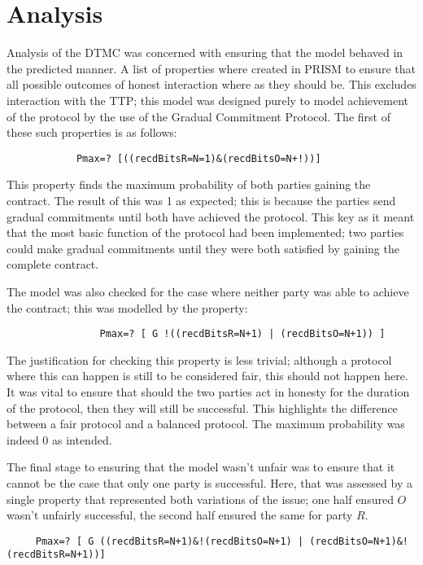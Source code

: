 \documentclass{l4proj}
\begin{document}
\section{Analysis}

Analysis of the DTMC was concerned with ensuring that the model behaved in the predicted manner. A list of properties where created in PRISM to ensure that all possible outcomes of honest interaction where as they should be. This excludes interaction with the TTP; this model was designed purely to model achievement of the protocol by the use of the Gradual Commitment Protocol. The first of these such properties is as follows:

\begin{lstlisting}
            Pmax=? [((recdBitsR=N=1)&(recdBitsO=N+!))]
\end{lstlisting}

This property finds the maximum probability of both parties gaining the contract. The result of this was 1 as expected; this is because the parties send gradual commitments until both have achieved the protocol. This key as it meant that the most basic function of the protocol had been implemented; two parties could make gradual commitments until they were both satisfied by gaining the complete contract.

The model was also checked for the case where neither party was able to achieve the contract; this was modelled by the property:

\begin{lstlisting}
                Pmax=? [ G !((recdBitsR=N+1) | (recdBitsO=N+1)) ]
\end{lstlisting}

The justification for checking this property is less trivial; although a protocol where this can happen is still to be considered fair, this should not happen here. It was vital to ensure that should the two parties act in honesty for the duration of the protocol, then they will still be successful. This highlights the difference between a fair protocol and a balanced protocol. The maximum probability was indeed 0 as intended.

The final stage to ensuring that the model wasn't unfair was to ensure that it cannot be the case that only one party is successful. Here, that was assessed by a single property that represented both variations of the issue; one half ensured $O$ wasn't unfairly successful, the second half ensured the same for party $R$.

\begin{lstlisting}
     Pmax=? [ G ((recdBitsR=N+1)&!(recdBitsO=N+1) | (recdBitsO=N+1)&!(recdBitsR=N+1))]
\end{lstlisting}
\end{document}
